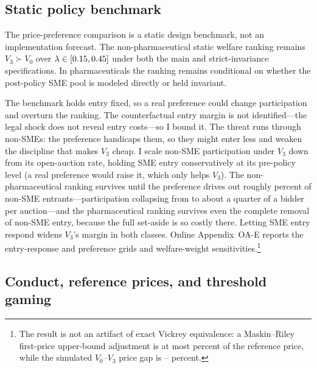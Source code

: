 \subsection{Static policy benchmark}

The price-preference comparison is a static design benchmark, not an
implementation forecast. The non-pharmaceutical static welfare ranking
remains $V_3 \succ V_0$ over
$\lambda\in[0.15,0.45]$ under both the main and
strict-invariance specifications. In pharmaceuticals the ranking remains
conditional on whether the post-policy SME pool is modeled directly or held
invariant.

The benchmark holds entry fixed, so a real preference could change
participation and overturn the ranking. The counterfactual entry margin is
not identified---the legal shock does not reveal entry costs---so I bound it.
The threat runs through non-SMEs: the preference handicaps them, so they
might enter less and weaken the discipline that makes $V_3$ cheap. I scale
non-SME participation under $V_3$ down from its open-auction rate, holding
SME entry conservatively at its pre-policy level (a real preference would
raise it, which only helps $V_3$). The non-pharmaceutical ranking survives
until the preference drives out roughly \entryFlipDiscNp{} percent of non-SME
entrants---participation collapsing from \bneNnsPreNp{} to about a quarter of
a bidder per auction---and the pharmaceutical ranking survives even the
complete removal of non-SME entry, because the full set-aside is so costly
there. Letting SME entry respond widens $V_3$'s margin in both classes.
Online Appendix~OA-E reports the entry-response and preference grids and
welfare-weight sensitivities.\footnote{The result is not an artifact of exact
Vickrey equivalence: a Maskin--Riley first-price upper-bound adjustment
\citep{maskinriley2000} is at most \maskinRileyBoundPct{} percent of the
reference price, while the simulated $V_0$--$V_3$ price gap is
\vZeroVThreeGapLo--\vZeroVThreeGapHi{} percent.}

\subsection{Conduct, reference prices, and threshold gaming}\label{sec:pref_endog}\label{sec:threshold}

